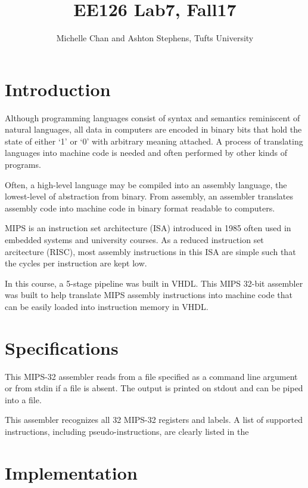 \documentclass[titlepage]{article}
\title{EE126 Lab7, Fall17}
\author{Michelle Chan and Ashton Stephens, Tufts University}
\begin{document}
\begin{titlepage}
\maketitle
\end{titlepage}

\section*{Introduction}




Although programming languages consist of syntax and semantics reminiscent 
of natural languages, all data in computers are encoded in binary bits that
hold the state of either `1' or `0' with arbitrary meaning attached. A process
of translating languages into machine code is needed and often performed by
other kinds of programs. 

Often, a high-level language may be compiled into an assembly language, the 
lowest-level of abstraction from binary. From assembly, an assembler translates 
assembly code into machine code in binary format readable to computers. 

MIPS is an instruction set architecture (ISA) introduced in 1985 often used in 
embedded systems and university courses. As a reduced instruction set 
arcitecture (RISC), most assembly instructions in this ISA are simple such that
the cycles per instruction are kept low. 

In this course, a 5-stage pipeline was built in VHDL. This MIPS 32-bit assembler
was built to help translate MIPS assembly instructions into machine code that 
can be easily loaded into instruction memory in VHDL. 

\section*{Specifications}
This MIPS-32 assembler reads from a file specified as a command line argument
or from stdin if a file is absent. The output is printed on stdout and can be
piped into a file.

This assembler recognizes all 32 MIPS-32 registers and labels. A list of 
supported instructions, including pseudo-instructions, are clearly listed in the

\section*{Implementation}
\end{document}
